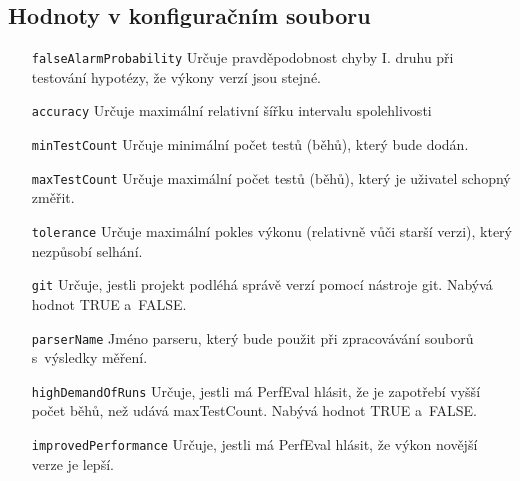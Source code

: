 \subsection*{Hodnoty v konfiguračním souboru}
\begin{itemize}[label=\texttt{\textbf{\textendash}}]
    \item[\texttt{falseAlarmProbability}]       Určuje pravděpodobnost chyby I. druhu při testování hypotézy, že výkony verzí jsou stejné.
    \item[\texttt{accuracy}]      Určuje maximální relativní šířku intervalu spolehlivosti
    \item[\texttt{minTestCount}]    Určuje minimální počet testů (běhů), který bude dodán.
    \item[\texttt{maxTestCount}]    Určuje maximální počet testů (běhů), který je uživatel schopný změřit.
    \item[\texttt{tolerance}]       Určuje maximální pokles výkonu (relativně vůči starší verzi), který nezpůsobí selhání.
    \item[\texttt{git}]             Určuje, jestli projekt podléhá správě verzí pomocí nástroje git. Nabývá hodnot TRUE a~FALSE.
    \item[\texttt{parserName}]      Jméno parseru, který bude použit při zpracovávání souborů s~výsledky měření.
    \item[\texttt{highDemandOfRuns}] Určuje, jestli má PerfEval hlásit, že je zapotřebí vyšší počet běhů, než udává maxTestCount. Nabývá hodnot TRUE a~FALSE.
    \item[\texttt{improvedPerformance}] Určuje, jestli má PerfEval hlásit, že výkon novější verze je lepší.
\end{itemize}
